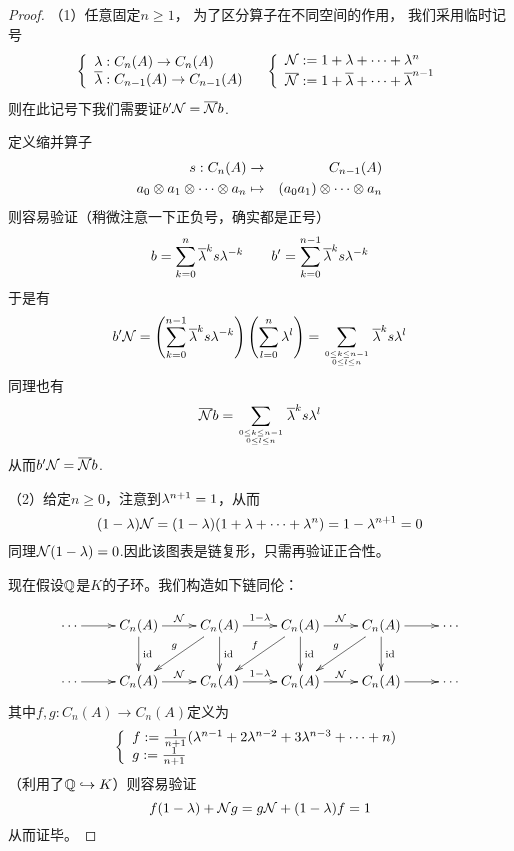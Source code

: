 
\begin{proof}（1）任意固定$n\geq 1$，
为了区分算子在不同空间的作用，
我们采用临时记号
$$\left\{\begin{array}{l}
\lambda:C_n(A)\to C_n(A)\\
\overline{\lambda}:C_{n-1}(A)\to C_{n-1}(A)
\end{array}\right.\quad
\left\{\begin{array}{l}
\mathcal{N}:=1+\lambda+\cdots+\lambda^n\\
\overline{\mathcal{N}}:=1+\overline{\lambda}+\cdots+\overline{\lambda}^{n-1}
\end{array}\right.$$
则在此记号下我们需要证$b'\mathcal{N}=\overline{\mathcal{N}}b$.

定义缩并算子
\begin{eqnarray*}
s:C_n(A)&\to& C_{n-1}(A)\\
a_0\otimes a_1\otimes\cdots\otimes a_n
&\mapsto&
(a_0a_1)\otimes\cdots\otimes a_n
\end{eqnarray*}
则容易验证（稍微注意一下正负号，确实都是正号）
$$
b =\sum\limits_{k=0}^n    \overline{\lambda}^ks\lambda^{-k}\quad\quad
b'=\sum\limits_{k=0}^{n-1}\overline{\lambda}^ks\lambda^{-k}
$$
于是有
$$
b'\mathcal{N}=
  \left(
    \sum_{k=0}^{n-1}
      \overline{\lambda}^ks\lambda^{-k}
  \right)
  \left(
    \sum_{l=0}^{n  }
      \lambda^l
  \right)
=
 \sum_{0\leq k\leq n-1
       \atop
       0\leq l\leq n}
     \overline{\lambda}^ks\lambda^l
$$
同理也有
$$\overline{\mathcal{N}}b
=\sum_{0\leq k\leq n-1
       \atop
       0\leq l\leq n}
     \overline{\lambda}^ks\lambda^l$$
从而$b'\mathcal{N}=\overline{\mathcal{N}}b$.

（2）给定$n\geq 0$，注意到$\lambda^{n+1}=1$，从而
$$(1-\lambda)\mathcal{N}=(1-\lambda)(1+\lambda+\cdots+\lambda^n)=1-\lambda^{n+1}=0$$
同理$\mathcal{N}(1-\lambda)=0$.因此该图表是链复形，只需再验证正合性。

现在假设$\mathbb{Q}$是$K$的子环。我们构造如下链同伦：

$$\xymatrix{
   \cdots \ar[r]
  &C_n(A) \ar[r]^{\mcalN} \ar[d]^{\id}
  &C_n(A) \ar[r]^{1-\lmd} \ar[d]^{\id} \ar[ld]_g
  &C_n(A) \ar[r]^{\mcalN} \ar[d]^{\id} \ar[ld]_f
  &C_n(A) \ar[r]^{      } \ar[d]^{\id} \ar[ld]_g
  &\cdots
\\
   \cdots \ar[r]
  &C_n(A) \ar[r]^{\mcalN}
  &C_n(A) \ar[r]^{1-\lmd}
  &C_n(A) \ar[r]^{\mcalN}
  &C_n(A) \ar[r]^{      }
  &\cdots
}$$
其中$f,g:C_n(A)\to C_n(A)$定义为
$$\left\{\begin{array}{l}
f:=\frac{1}{n+1}(\lambda^{n-1}+2\lambda^{n-2}+3\lambda^{n-3}+\cdots+n)\\
g:=\frac{1}{n+1}
\end{array}\right.$$
（利用了$\mathbb{Q}\hookrightarrow K$）则容易验证
$$f(1-\lambda)+\mathcal{N} g=g\mathcal{N}+(1-\lambda)f=1$$
从而证毕。
\end{proof}

